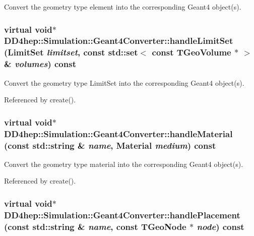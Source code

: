 Convert the geometry type element into the corresponding Geant4 object(s). \hypertarget{class_d_d4hep_1_1_simulation_1_1_geant4_converter_ab2b11fdbfec73e218a533bb84f998679}{
\subsubsection[{handleLimitSet}]{\setlength{\rightskip}{0pt plus 5cm}virtual void$\ast$ DD4hep::Simulation::Geant4Converter::handleLimitSet ({\bf LimitSet} {\em limitset}, \/  const std::set$<$ const TGeoVolume $\ast$ $>$ \& {\em volumes}) const}}
\label{class_d_d4hep_1_1_simulation_1_1_geant4_converter_ab2b11fdbfec73e218a533bb84f998679}


Convert the geometry type LimitSet into the corresponding Geant4 object(s). 

Referenced by create().\hypertarget{class_d_d4hep_1_1_simulation_1_1_geant4_converter_ac62685399e2c393c8d605d664353731c}{
\subsubsection[{handleMaterial}]{\setlength{\rightskip}{0pt plus 5cm}virtual void$\ast$ DD4hep::Simulation::Geant4Converter::handleMaterial (const std::string \& {\em name}, \/  {\bf Material} {\em medium}) const}}
\label{class_d_d4hep_1_1_simulation_1_1_geant4_converter_ac62685399e2c393c8d605d664353731c}


Convert the geometry type material into the corresponding Geant4 object(s). 

Referenced by create().\hypertarget{class_d_d4hep_1_1_simulation_1_1_geant4_converter_a1a39afd969a6e73e22ea69229b06666c}{
\subsubsection[{handlePlacement}]{\setlength{\rightskip}{0pt plus 5cm}virtual void$\ast$ DD4hep::Simulation::Geant4Converter::handlePlacement (const std::string \& {\em name}, \/  const TGeoNode $\ast$ {\em node}) const}}
\label{class_d_d4hep_1_1_simulation_1_1_geant4_converter_a1a39afd969a6e73e22ea69229b06666c}


